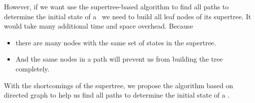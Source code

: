 However, if we want use the supertree-based algorithm to find all paths to determine the initial state of a \BCN\ we need to build all leaf nodes of its supertree. It would take many additional time and space overhead. Because 
\begin{itemize}
 \item there are many nodes with the same set of states in the supertree.
 \item And the same nodes in a path will prevent us from building the tree completely.
 \end{itemize}
 
With the shortcomings of the supertree, we propose the algorithm based on directed graph to help us find all paths to determine the initial state of a \BCN.
